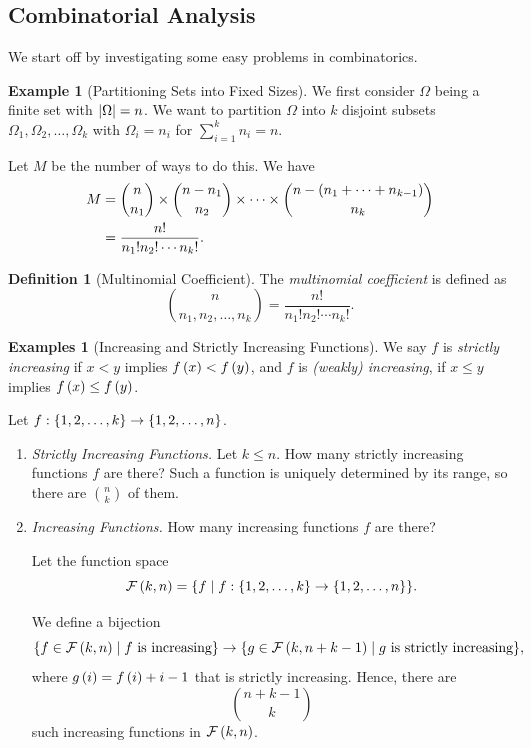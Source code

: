 \documentclass{article}
\theoremstyle{definition}
\newtheorem{definition}[theorem]{Definition}
\newtheorem{example}[theorem]{Example}
\newtheorem{examples}[theorem]{Examples}
\theoremstyle{remark}
\DeclarePairedDelimiter{\abs}{\lvert}{\rvert}
\newcommand{\eventSpace}{\mathcal{F}}
\newcommand{\set}[2]{\{#1\mid #2\}}
\newcommand{\functiondomain}[3]{#1:#2\to #3}
\begin{document}
\subsection{Combinatorial Analysis}
We start off by investigating some easy problems in combinatorics.

\begin{example}[Partitioning Sets into Fixed Sizes]
    \label{ex:partition-sets-given-size}%
    We first consider \(\Omega\) being a finite set with \(\abs{\Omega} = n\). We want to partition \(\Omega\) into \(k\) disjoint subsets \(\Omega_1, \Omega_2, \ldots, \Omega_k\) with \(\Omega_i = n_i\) for \(\sum_{i = 1}^{k} n_i = n\).

    Let \(M\) be the number of ways to do this. We have
    \begin{align*}
        M &= \binom{n}{n_1} \times \binom{n - n_1}{n_2} \times \cdots \times \binom{n - \left(n_1 + \cdots + n_{k - 1}\right)}{n_k} \\
        &= \frac{n!}{n_1! n_2! \cdots n_k!}.
    \end{align*}
\end{example}

\begin{definition}[Multinomial Coefficient]
    \label{def:multinomial-coeff}%
    The \emph{multinomial coefficient} is defined as
    \[
        \binom{n}{n_1, n_2, \ldots, n_k} = \frac{n!}{n_1! n_2! \cdots n_k!}.
    \]
\end{definition}

\begin{examples}[Increasing and Strictly Increasing Functions]
    \label{ex:increasing-functions}%
    We say \(f\) is \emph{strictly increasing} if \(x < y\) implies \(f\left(x\right) < f\left(y\right)\), and \(f\) is \emph{(weakly) increasing}, if \(x \leq y\) implies \(f\left(x\right) \leq f\left(y\right)\).

    Let \(\functiondomain{f}{\Bqty{1, 2, \ldots, k}}{\Bqty{1, 2, \ldots, n}}\).
    
    \begin{enumerate}
        \item \textit{Strictly Increasing Functions.} Let \(k \leq n\). How many strictly increasing functions \(f\) are there? Such a function is uniquely determined by its range, so there are \(\binom{n}{k}\) of them.
        \item \textit{Increasing Functions.} How many increasing functions \(f\) are there?
        
        Let the function space
        \[
            \eventSpace\pqty{k, n} = \set{f}{\functiondomain{f}{\Bqty{1, 2, \ldots, k}}{\Bqty{1, 2, \ldots, n}}}.
        \]
        
        We define a bijection
        \[
            \set{f \in \eventSpace\pqty{k, n}}{f \text{ is increasing}} \to \set{g \in \eventSpace\pqty{k, n + k - 1}}{g \text{ is strictly increasing}},
        \]
        where \(g\left(i\right) = f\left(i\right) + i - 1\) that is strictly increasing. Hence, there are
        \[
            \binom{n + k - 1}{k}
        \]
        such increasing functions in \(\eventSpace\pqty{k, n}\).
    \end{enumerate}
\end{examples}
\end{document}
